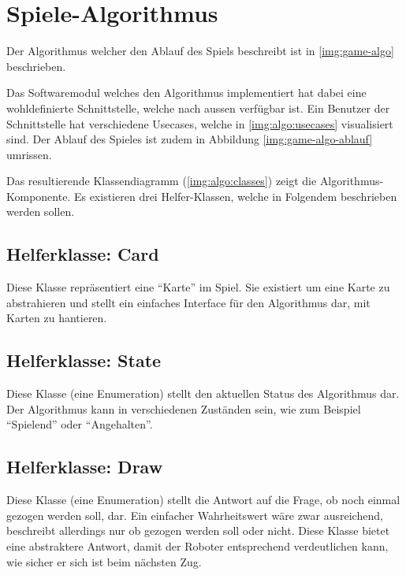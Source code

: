 \chapter{Spiele-Algorithmus}

    Der Algorithmus welcher den Ablauf des Spiels beschreibt ist in
    \ref{img:game-algo} beschrieben.

    Das Softwaremodul welches den Algorithmus implementiert hat dabei eine
    wohldefinierte Schnittstelle, welche nach aussen verfügbar ist.
    Ein Benutzer der Schnittstelle hat verschiedene Usecases, welche in
    \ref{img:algo:usecases} visualisiert sind.
    Der Ablauf des Spieles ist zudem in Abbildung \ref{img:game-algo-ablauf}
    umrissen.

    Das resultierende Klassendiagramm (\ref{img:algo:classes}) zeigt die
    Algorithmus-Komponente.
    Es existieren drei Helfer-Klassen, welche in Folgendem beschrieben werden
    sollen.

    \section{Helferklasse: Card}

        Diese Klasse repräsentiert eine ``Karte'' im Spiel.
        Sie existiert um eine Karte zu abstrahieren und stellt ein einfaches
        Interface für den Algorithmus dar, mit Karten zu hantieren.

    \section{Helferklasse: State}

        Diese Klasse (eine Enumeration) stellt den aktuellen Status des
        Algorithmus dar.
        Der Algorithmus kann in verschiedenen Zuständen sein, wie zum Beispiel
        ``Spielend'' oder ``Angehalten''.

    \section{Helferklasse: Draw}

        Diese Klasse (eine Enumeration) stellt die Antwort auf die Frage, ob
        noch einmal gezogen werden soll, dar.
        Ein einfacher Wahrheitswert wäre zwar ausreichend, beschreibt allerdings
        nur ob gezogen werden soll oder nicht.
        Diese Klasse bietet eine abstraktere Antwort, damit der Roboter
        entsprechend verdeutlichen kann, wie sicher er sich ist beim nächsten
        Zug.

